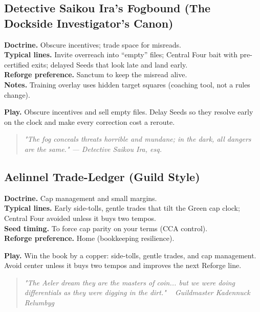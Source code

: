 \documentclass[11pt]{article}
\providecommand{\playdesc}[1]{\par\smallskip\noindent\small\textbf{Play.} #1\par}
\begin{document}
\subsection*{Detective Saikou Ira’s Fogbound (The Dockside Investigator's Canon)}
\textbf{Doctrine.} Obscure incentives; trade space for misreads.\\
\textbf{Typical lines.} Invite overreach into ``empty'' files; Central Four bait with pre-certified exits; delayed Seeds that look late and land early.\\
\textbf{Reforge preference.} Sanctum to keep the misread alive.\\
\textbf{Notes.} Training overlay uses hidden target squares (coaching tool, not a rules change).
\playdesc{Obscure incentives and sell empty files. Delay Seeds so they resolve early on the clock and make every correction cost a reroute.}
\begin{quote}\small\itshape
"The fog conceals threats horrible and mundane; in the dark, all dangers are the same." — Detective Saikou Ira, esq.
\end{quote}

\subsection*{Aelinnel Trade-Ledger (Guild Style)}
\textbf{Doctrine.} Cap management and small margins.\\
\textbf{Typical lines.} Early side-tolls, gentle trades that tilt the Green cap clock; Central Four avoided unless it buys two tempos.\\
\textbf{Seed timing.} To force cap parity on your terms (CCA control).\\
\textbf{Reforge preference.} Home (bookkeeping resilience).
\playdesc{Win the book by a copper: side-tolls, gentle trades, and cap management. Avoid center unless it buys two tempos and improves the next Reforge line.}
\begin{quote}\small\itshape
"The Aeler dream they are the masters of coin... but we were doing differentials as they were digging in the dirt." ~ Guildmaster Kadennuck Relumbyg
\end{quote}
\end{document}
